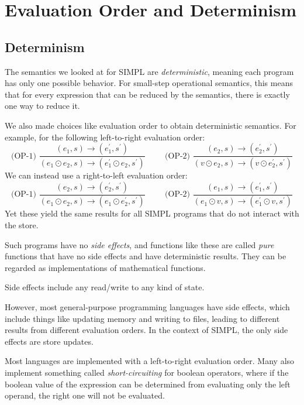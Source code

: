 \section{Evaluation Order and Determinism}
\subsection{Determinism}
The semantics we looked at for SIMPL are \textit{deterministic}, meaning each program has only one possible behavior. For small-step operational semantics, this means that for every expression that can be reduced by the semantics, there is exactly one way to reduce it. 

We also made choices like evaluation order to obtain deterministic semantics. For example, for the following left-to-right evaluation order: 
\[
  \text{(OP-1) } \dfrac{(e_1, s) \to (e_1^{\prime}, s^{\prime})}{(e_1 \odot e_2, s) \to (e_1^{\prime} \odot e_2, s^{\prime})} \hspace{1cm} 
  \text{(OP-2) } \dfrac{(e_2, s) \to (e_2^{\prime}, s^{\prime})}{(v \odot e_2, s) \to (v \odot e_2^{\prime}, s^{\prime})}
\]
We can instead use a right-to-left evaluation order:
\[
  \text{(OP-1) } \dfrac{(e_2, s) \to (e_2^{\prime}, s^{\prime})}{(e_1 \odot e_2, s) \to (e_1 \odot e_2^{\prime}, s^{\prime})} \hspace{1cm} 
  \text{(OP-2) } \dfrac{(e_1, s) \to (e_1^{\prime}, s^{\prime})}{(e_1 \odot v, s) \to (e_1^{\prime} \odot v, s^{\prime})}
\]
Yet these yield the same results for all SIMPL programs that do not interact with the store.

Such programs have no \textit{side effects}, and functions like these are called \textit{pure} functions that have no side effects and have deterministic results. They can be regarded as implementations of mathematical functions. 

\begin{remark}
  Side effects include any read/write to any kind of state. 
\end{remark}

However, most general-purpose programming languages have side effects, which include things like updating memory and writing to files, leading to different results from different evaluation orders. In the context of SIMPL, the only side effects are store updates. 

Most languages are implemented with a left-to-right evaluation order. Many also implement something called \textit{short-circuiting} for boolean operators, where if the boolean value of the expression can be determined from evaluating only the left operand, the right one will not be evaluated. 

